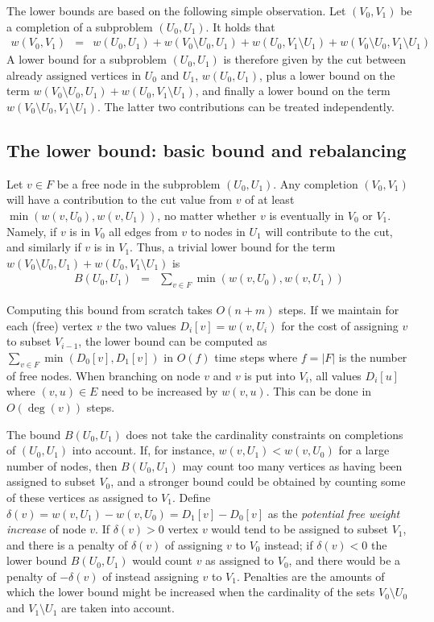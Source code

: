 \documentclass[a4paper,11pt]{article}
\begin{document}
The lower bounds are based on the following simple observation.  Let
$(V_0,V_1)$ be a completion of a subproblem $(U_0,U_1)$. It holds that
\begin{eqnarray*}
w(V_0,V_1) & = & w(U_0,U_1) + 
w(V_0\setminus U_0,U_1) + w(U_0,V_1\setminus U_1) +
w(V_0\setminus U_0,V_1\setminus U_1)
\end{eqnarray*}
A lower bound for a subproblem $(U_0,U_1)$ is therefore given by the
cut between already assigned vertices in $U_0$ and $U_1$, $w(U_0,U_1)$,
plus a lower bound on the term $w(V_0\setminus
U_0,U_1)+w(U_0,V_1\setminus U_1)$, and finally a lower bound on the term
$w(V_0\setminus U_0,V_1\setminus U_1)$. The latter two contributions
can be treated independently.

\subsection{The lower bound: basic bound and rebalancing}
\label{sec:basicrebalance}

Let $v\in F$ be a free node in the subproblem $(U_0,U_1)$. Any
completion $(V_0,V_1)$ will have a contribution to the cut value from
$v$ of at least $\min(w(v,U_0),w(v,U_1))$, no matter whether $v$ is
eventually in $V_0$ or $V_1$. Namely, if $v$ is in $V_0$ all
edges from $v$ to nodes in $U_1$ will contribute to the cut, and
similarly if $v$ is in $V_1$. Thus, a trivial lower bound for
the term  $w(V_0\setminus U_0,U_1) + w(U_0,V_1\setminus U_1)$ is
\begin{eqnarray*}
B(U_0,U_1) & = & \sum_{v\in F}\min(w(v,U_0),w(v,U_1))
\end{eqnarray*}

Computing this bound from scratch takes $O(n+m)$ steps. If we maintain
for each (free) vertex $v$ the two values $D_i[v] = w(v,U_i)$ for
the cost of assigning $v$ to subset $V_{i-1}$, the lower bound can be
computed as $\sum_{v\in F}\min(D_0[v],D_1[v])$ in $O(f)$ time steps
where $f=|F|$ is the number of free nodes. When branching on node $v$
and $v$ is put into $V_i$, all values $D_{i}[u]$ where $(v,u)\in
E$ need to be increased by $w(v,u)$. This can be done in $O(\deg(v))$
steps.

The bound $B(U_0,U_1)$ does not take the cardinality constraints on
completions of $(U_0,U_1)$ into account. If, for instance,
$w(v,U_1)<w(v,U_0)$ for a large number of nodes, then $B(U_0,U_1)$ may
count too many vertices as having been assigned to subset $V_0$, and a
stronger bound could be obtained by counting some of these vertices as
assigned to $V_1$. Define $\delta(v) =
w(v,U_1)-w(v,U_0)=D_1[v]-D_0[v]$ as the \emph{potential free weight
  increase} of node $v$. If $\delta(v)>0$ vertex $v$ would tend to be
assigned to subset $V_1$, and there is a penalty of $\delta(v)$ of
assigning $v$ to $V_0$ instead; if $\delta(v)<0$ the lower bound
$B(U_0,U_1)$ would count $v$ as assigned to $V_0$, and there would be
a penalty of $-\delta(v)$ of instead assigning $v$ to $V_1$. Penalties
are the amounts of which the lower bound might be increased when the
cardinality of the sets $V_0\setminus U_0$ and $V_1\setminus U_1$ are
taken into account. 
\end{document}
